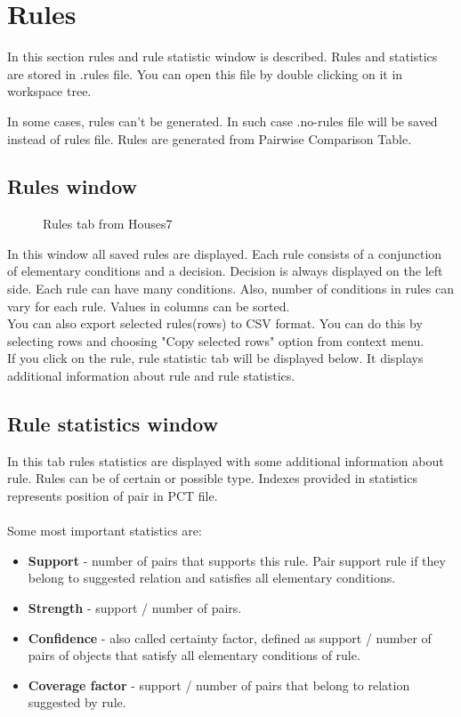 \section{Rules}\label{section:rules}

In this section rules and rule statistic window is described. Rules and statistics are stored in .rules file. You can open this file by double clicking on it in workspace tree.

In some cases, rules can't be generated. In such case .no-rules file will be saved instead of rules file. Rules are generated from Pairwise Comparison Table.

\subsection{Rules window}\label{sub:rules}

\begin{figure*}[!ht] 
	\centering
	\caption{Rules tab from Houses7}
\end{figure*}

In this window all saved rules are displayed. Each rule consists of a conjunction of elementary conditions and a decision. Decision is always displayed on the left side. Each rule can have many conditions. Also, number of conditions in rules can vary for each rule. Values in columns can be sorted.\\

You can also export selected rules(rows) to CSV format. You can do this by selecting rows and choosing "Copy selected rows" option from context menu.\\

If you click on the rule, rule statistic tab will be displayed below. It displays additional information about rule and rule statistics.

\subsection{Rule statistics window}\label{sub:rule-stat}

In this tab rules statistics are displayed with some additional information about rule.
Rules can be of certain or possible type. Indexes provided in statistics represents position of pair in PCT file.\\\\

Some most important statistics are:
\begin{itemize}
	\item \textbf{Support} - number of pairs that supports this rule. Pair support rule if they belong to suggested relation and satisfies all elementary conditions.
	\item \textbf{Strength} - support / number of pairs.
	\item \textbf{Confidence} - also called certainty factor, defined as support / number of pairs of objects that satisfy all elementary conditions of rule.
	\item \textbf{Coverage factor} - support / number of pairs that belong to relation suggested by rule.
\end{itemize}

